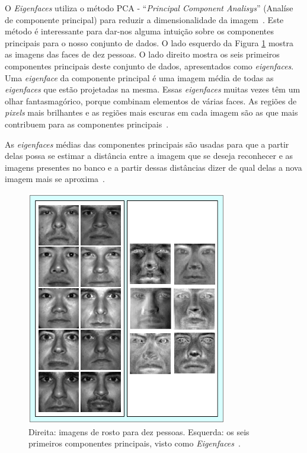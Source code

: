 	O \textit{Eigenfaces} utiliza o método PCA - ``\textit{Principal Component
	Analisys}'' (Analíse de componente principal) para reduzir a dimensionalidade da
	imagem~\cite{hewitt}. Este método é interessante para dar-nos alguma intuição
	sobre os componentes principais para o nosso conjunto de dados. O lado esquerdo
	da Figura \ref{exemploEigenfaces} mostra as imagens das faces de dez pessoas. O
	lado direito  mostra os seis primeiros componentes principais deste conjunto de
	dados, apresentados como \textit{eigenfaces}. Uma \textit{eigenface} da
	componente principal é uma imagem média de todas as \textit{eigenfaces} que
	estão projetadas na mesma. Essas \textit{eigenfaces} muitas vezes têm um olhar
	fantasmagórico, porque combinam elementos de várias faces. As regiões de
	\textit{pixels} mais brilhantes e as regiões mais escuras em cada imagem são as
	que mais contribuem para as componentes principais~\cite{hewitt}.
	
	As \textit{eigenfaces} médias das componentes principais são usadas para que a
	partir delas possa se estimar a distância entre a imagem que se deseja
	reconhecer e as imagens presentes no banco e a partir dessas distâncias dizer de
	qual delas a nova imagem mais se aproxima~\cite{turkpentland}.

	\begin{figure}[H]
		\begin{center}
			\includegraphics[scale=1.2]{figuras/2.FundamentacaoTeorica/eigenfaces.png}
		\end{center}
		\caption{Direita: imagens de rosto para dez pessoas. Esquerda: os seis primeiros componentes principais, visto como \textit{Eigenfaces}~\cite{hewitt}.}
		\label{exemploEigenfaces}
	\end{figure}

